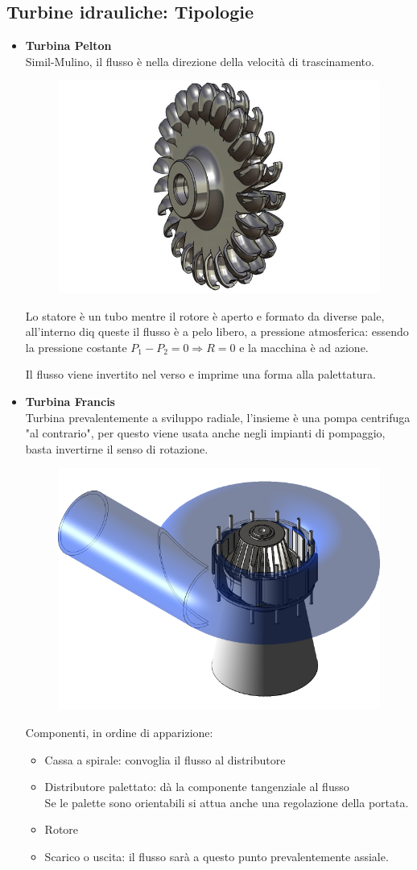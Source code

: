 \documentclass[a4paper, 15pt]{article}
\begin{document}
\subsection{Turbine idrauliche: Tipologie}
\begin{adjustwidth}{2in}{}
	\begin{itemize}
		\item \textbf{Turbina Pelton}\\
		Simil-Mulino, il flusso è nella direzione della velocità di trascinamento. 
		\begin{figure}[H]
			\centering
			\includegraphics[width=0.4\linewidth]{immagini/turbinapelton1}
			\label{fig:turbinapelton1}
		\end{figure}		
		Lo statore è un tubo mentre il rotore è aperto e formato da diverse pale, all'interno diq queste il flusso è a pelo libero, a pressione atmosferica: essendo la pressione costante $P_1-P_2=0\Rightarrow R=0$ e la macchina è ad azione. \newline 
		
		Il flusso viene invertito nel verso e imprime una forma alla palettatura. 
		
		
		\item \textbf{Turbina Francis} \\
		Turbina prevalentemente a sviluppo radiale, l'insieme è una pompa centrifuga "al contrario", per questo viene usata anche negli impianti di pompaggio, basta invertirne il senso di rotazione. 
		\begin{figure}[H]
			\centering
			\includegraphics[width=0.4\linewidth]{immagini/turbinafrancis1}
			\label{fig:turbinafrancis1}
		\end{figure}
\newpage	
		Componenti, in ordine di apparizione:
		\begin{itemize}
			\item Cassa a spirale: convoglia il flusso al distributore
			\item Distributore palettato: dà la componente tangenziale al flusso \\ Se le palette sono orientabili si attua anche una regolazione della portata.
			\item Rotore
			\item Scarico o uscita: il flusso sarà a questo punto prevalentemente assiale.
		\end{itemize}
	

\end{itemize}
\end{adjustwidth}
\end{document}
